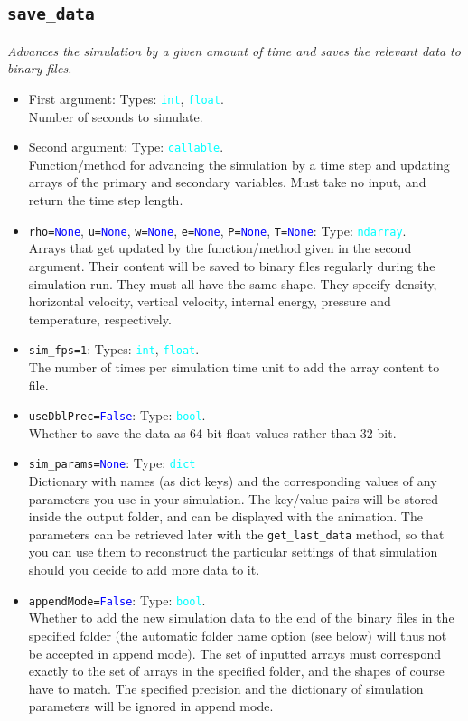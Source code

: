 \documentclass{article}
\newcommand{\ttt}[1]{\texttt{#1}}
\newcommand{\ptype}[1]{\texttt{\textcolor{cyan}{#1}}}
\newcommand{\cbl}[1]{\textcolor{blue}{#1}}
\newcommand{\cro}[1]{\textcolor{RedOrange}{#1}}
\begin{document}
\subsection{\ttt{save\_data}}
\label{sec:sd}
\textit{Advances the simulation by a given amount of time and saves the relevant data to binary files.}
\begin{itemize}
	\item First argument: Types: \ptype{int}, \ptype{float}.\\Number of seconds to simulate.
	\item Second argument: Type: \ptype{callable}.\\Function/method for advancing the simulation by a time step and updating arrays of the primary and secondary variables. Must take no input, and return the time step length.
	\item \ttt{\cro{rho}=\cbl{None}}, \ttt{\cro{u}=\cbl{None}}, \ttt{\cro{w}=\cbl{None}}, \ttt{\cro{e}=\cbl{None}}, \ttt{\cro{P}=\cbl{None}}, \ttt{\cro{T}=\cbl{None}}: Type: \ptype{ndarray}.\\Arrays that get updated by the function/method given in the second argument. Their content will be saved to binary files regularly during the simulation run. They must all have the same shape. They specify density, horizontal velocity, vertical velocity, internal energy, pressure and temperature, respectively.
	\item \ttt{\cro{sim\_fps}=1}: Types: \ptype{int}, \ptype{float}.\\The number of times per simulation time unit to add the array content to file.
	\item \ttt{\cro{useDblPrec}=\cbl{False}}: Type: \ptype{bool}.\\Whether to save the data as 64 bit float values rather than 32 bit.
	\item \ttt{\cro{sim\_params}=\cbl{None}}: Type: \ptype{dict}\\Dictionary with names (as dict keys) and the corresponding values of any parameters you use in your simulation. The key/value pairs will be stored inside the output folder, and can be displayed with the animation. The parameters can be retrieved later with the \ttt{get\_last\_data} method, so that you can use them to reconstruct the particular settings of that simulation should you decide to add more data to it.
	\item\ttt{\cro{appendMode}=\cbl{False}}: Type: \ptype{bool}.\\Whether to add the new simulation data to the end of the binary files in the specified folder (the automatic folder name option (see below) will thus not be accepted in append mode). The set of inputted arrays must correspond exactly to the set of arrays in the specified folder, and the shapes of course have to match. The specified precision and the dictionary of simulation parameters will be ignored in append mode.

\end{itemize}
\end{document}
